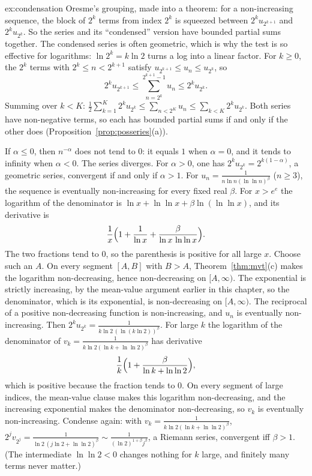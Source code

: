 \begin{solution}{ex:condensation}
\idea Oresme's grouping, made into a theorem: for a non-increasing sequence, the block of $2^k$ terms from index $2^k$ is squeezed between $2^ku_{2^{k+1}}$ and $2^ku_{2^k}$. So the series and its ``condensed'' version have bounded partial sums together. The condensed series is often geometric, which is why the test is so effective for logarithms: $\ln2^k=k\ln2$ turns a log into a linear factor.
\writeup For $k\ge0$, the $2^k$ terms with $2^k\le n<2^{k+1}$ satisfy $u_{2^{k+1}}\le u_n\le u_{2^k}$, so
\[
2^ku_{2^{k+1}}\le\sum_{n=2^k}^{2^{k+1}-1}u_n\le2^ku_{2^k}.
\]
Summing over $k<K$: $\frac12\sum_{k=1}^{K}2^ku_{2^k}\le\sum_{n<2^K}u_n\le\sum_{k<K}2^ku_{2^k}$. Both series have non-negative terms, so each has bounded partial sums if and only if the other does (Proposition~\ref{prop:posseries}(a)).

If $\alpha\le 0$, then $n^{-\alpha}$ does not tend to $0$: it equals $1$ when $\alpha=0$, and it tends to infinity when $\alpha<0$. The series diverges. For $\alpha>0$, one has $2^ku_{2^k}=2^{k(1-\alpha)}$, a geometric series, convergent if and only if $\alpha>1$.
For $u_n=\frac1{n\ln n(\ln\ln n)^\beta}$ ($n\ge3$), the sequence is eventually non-increasing for every fixed real $\beta$. For $x>e^e$ the logarithm of the denominator is $\ln x+\ln\ln x+\beta\ln(\ln\ln x)$, and its derivative is
\[
\frac1x\Bigl(1+\frac1{\ln x}+\frac{\beta}{\ln x\,\ln\ln x}\Bigr).
\]
The two fractions tend to $0$, so the parenthesis is positive for all large $x$. Choose such an $A$. On every segment $[A,B]$ with $B>A$, Theorem~\ref{thm:mvt}(c) makes the logarithm non-decreasing, hence non-decreasing on $[A,\infty)$. The exponential is strictly increasing, by the mean-value argument earlier in this chapter, so the denominator, which is its exponential, is non-decreasing on $[A,\infty)$. The reciprocal of a positive non-decreasing function is non-increasing, and $u_n$ is eventually non-increasing. Then $2^ku_{2^k}=\frac1{k\ln2\,(\ln(k\ln2))^\beta}$. For large $k$ the logarithm of the denominator of $v_k=\frac1{k\ln2(\ln k+\ln\ln2)^\beta}$ has derivative
\[
\frac1k\Bigl(1+\frac{\beta}{\ln k+\ln\ln2}\Bigr),
\]
which is positive because the fraction tends to $0$. On every segment of large indices, the mean-value clause makes this logarithm non-decreasing, and the increasing exponential makes the denominator non-decreasing, so $v_k$ is eventually non-increasing. Condense again: with $v_k=\frac1{k\ln2(\ln k+\ln\ln2)^\beta}$, $2^jv_{2^j}=\frac1{\ln2\,(j\ln2+\ln\ln2)^\beta}\sim\frac{1}{(\ln2)^{1+\beta}j^\beta}$, a Riemann series, convergent iff $\beta>1$. (The intermediate $\ln\ln2<0$ changes nothing for $k$ large, and finitely many terms never matter.)
\end{solution}

